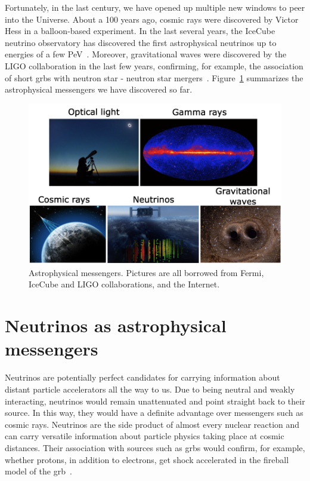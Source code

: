 Fortunately, in the last century, we have opened up multiple new windows to peer into the Universe. 
About a 100 years ago, cosmic rays were discovered by Victor Hess in a balloon-based experiment. In the last several years, the IceCube neutrino observatory has discovered the first astrophysical neutrinos up to energies of a few PeV~\cite{icecube_first_pev}. Moreover, gravitational waves were discovered by the LIGO collaboration in the last few years, confirming, for example, the association of short \gls{grbs} with neutron star - neutron star mergers~\cite{ligo_short}. Figure~\ref{messengers} summarizes the astrophysical messengers we have discovered so far.


\begin{figure}
\centering
\includegraphics[width=1.0\textwidth]{figures/messengers_2.png}
\caption{Astrophysical messengers. Pictures are all borrowed from Fermi, IceCube and LIGO collaborations, and the Internet.}
\label{messengers}
\end{figure}

\section{Neutrinos as astrophysical messengers}

Neutrinos are potentially perfect candidates for carrying information about distant particle accelerators all the way to us. Due to being neutral and weakly interacting, neutrinos would remain unattenuated and point straight back to their source. In this way, they would have a definite advantage over messengers such as cosmic rays. Neutrinos are the side product of almost every nuclear reaction and can carry versatile information about particle physics taking place at cosmic distances. Their association with sources such as \gls{grbs} would confirm, for example, whether protons, in addition to electrons, get shock accelerated in the fireball model of the \gls{grb}~\cite{Waxmanreview}.

